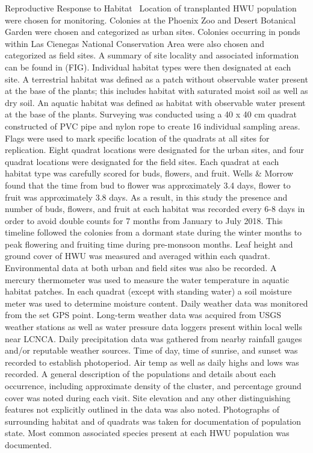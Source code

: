 \documentclass[multicol]{elsarticle}
\begin{document}
\begin{multicols}{2}
\begin{subsection}{Reproductive Response to Habitat}
\,
Location of transplanted HWU population were chosen for monitoring. Colonies at the Phoenix Zoo and Desert Botanical Garden were chosen and categorized as urban sites. Colonies occurring in ponds within Las Cienegas National Conservation Area were also chosen and categorized as field sites. A summary of site locality and associated information can be found in (FIG). Individual habitat types were then designated at each site. A terrestrial habitat was defined as a patch without observable water present at the base of the plants; this includes habitat with saturated moist soil as well as dry soil. An aquatic habitat was defined as habitat with observable water present at the base of the plants. Surveying was conducted using a 40 x 40 cm quadrat constructed of PVC pipe and nylon rope to create 16 individual sampling areas. Flags were used to mark specific location of the quadrats at all sites for replication. Eight quadrat locations were designated for the urban sites, and four quadrat locations were designated for the field sites. Each quadrat at each habitat type was carefully scored for buds, flowers, and fruit. Wells & Morrow found that the time from bud to flower was approximately 3.4 days, flower to fruit was approximately 3.8 days. As a result, in this study the presence and number of buds, flowers, and fruit at each habitat was recorded every 6-8 days in order to avoid double counts for 7 months from January to July 2018. This timeline followed the colonies from a dormant state during the winter months to peak flowering and fruiting time during pre-monsoon months. Leaf height and ground cover of HWU was measured and averaged within each quadrat. Environmental data at both urban and field sites was also be recorded. A mercury thermometer was used to measure the water temperature in aquatic habitat patches. In each quadrat (except with standing water) a soil moisture meter was used to determine moisture content. Daily weather data was monitored from the set GPS point. Long-term weather data was acquired from USGS weather stations as well as water pressure data loggers present within local wells near LCNCA. Daily precipitation data was gathered from nearby rainfall gauges and/or reputable weather sources. Time of day, time of sunrise, and sunset was recorded to establish photoperiod. Air temp as well as daily highs and lows was recorded. A general description of the populations and details about each occurrence, including approximate density of the cluster, and percentage ground cover was noted during each visit. Site elevation and any other distinguishing features not explicitly outlined in the data was also noted. Photographs of surrounding habitat and of quadrats was taken for documentation of population state. Most common associated species present at each HWU population was documented.
\end{subsection}


\end{multicols}
\end{document}
